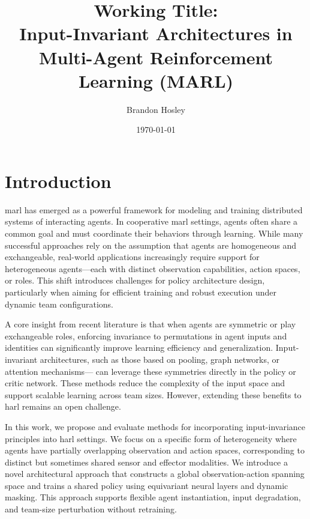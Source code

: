 \documentclass{article}
\title{Working Title: \\
Input-Invariant Architectures in Multi-Agent Reinforcement Learning (MARL)}
\author{Brandon Hosley}
\date{\today}
\begin{document}
\maketitle


\section{Introduction}

\Gls{marl} has emerged as a powerful framework for modeling and 
training distributed systems of interacting agents. 
In cooperative \gls{marl} settings, agents often share a common goal and 
must coordinate their behaviors through learning. 
While many successful approaches rely on the assumption that agents are 
homogeneous and exchangeable, real-world applications increasingly 
require support for heterogeneous agents—each with distinct observation capabilities, 
action spaces, or roles. 
This shift introduces challenges for policy architecture design, 
particularly when aiming for efficient training and robust 
execution under dynamic team configurations.

A core insight from recent literature is that when agents 
are symmetric or play exchangeable roles, enforcing invariance 
to permutations in agent inputs and identities can significantly 
improve learning efficiency and generalization. 
Input-invariant architectures, such as those based on pooling, 
graph networks, or attention mechanisms—
can leverage these symmetries
directly in the policy or critic network. 
These methods reduce the complexity of the input space 
and support scalable learning across team sizes. 
However, extending these benefits to \gls{harl} remains an open challenge.

In this work, we propose and evaluate methods for incorporating 
input-invariance principles into \gls{harl} settings. 
We focus on a specific form of heterogeneity where agents 
have partially overlapping observation and action spaces, 
corresponding to distinct but sometimes shared sensor and effector modalities. 
We introduce a novel architectural approach that constructs a 
global observation-action spanning space and trains a 
shared policy using equivariant neural layers and dynamic masking. 
This approach supports flexible agent instantiation, input degradation, 
and team-size perturbation without retraining.
\end{document}
